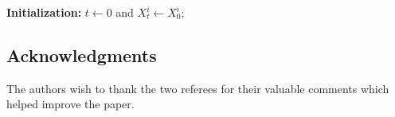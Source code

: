 \documentclass[12pt]{amsart}
\numberwithin{equation}{section}
\begin{document}
\begin{algorithm}
\caption{The (rescaled) CBO algorithm}\label{alg: cbo k}

\hfill

\textbf{Initialization:} $t\gets 0$ and $X^{i}_{t}\gets X^{i}_{0}$; 

\hfill



\end{algorithm}

\subsection*{Acknowledgments}
The authors wish to thank the two referees for their valuable comments which helped improve the paper.


\end{document}

